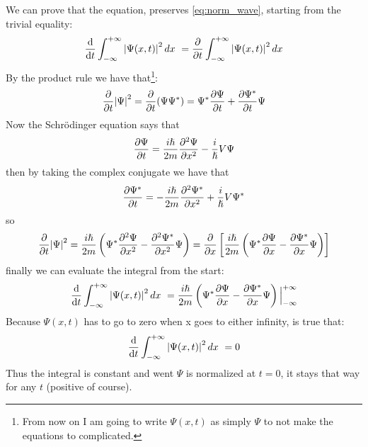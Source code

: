 We can prove that the equation, preserves \ref{eq:norm_wave}, starting from the trivial equality:
$$
\dv{t} \int_{-\infty}^{+\infty}\abs{\Psi(x,t)}^2\, dx\ = \pdv{t} \int_{-\infty}^{+\infty}\abs{\Psi(x,t)}^2\, dx
$$
By the product rule we have that\footnote{From now on I am going to write $\Psi(x,t)$ as simply $\Psi$ to not make the equations to complicated.}:
$$
\pdv{t}\abs{\Psi}^2 = \pdv{t}(\Psi\Psi^*) = \Psi^*\pdv{\Psi}{t} + \pdv{\Psi^*}{t}\Psi
$$
Now the Schrödinger equation says that 
$$
\pdv{\Psi}{t} = \frac{i\hslash}{2m}\pdv[2]{\Psi}{x} -  \frac{i}{\hslash}V\Psi
$$
then by taking the complex conjugate we have that 
$$
\pdv{\Psi^*}{t} = - \frac{i\hslash}{2m}\pdv[2]{\Psi^*}{x} + \frac{i}{\hslash}V\Psi^*
$$
so
$$
\pdv{t}\abs{\Psi}^2 = \frac{i\hslash}{2m} \left( \Psi^*\pdv[2]{\Psi}{x} - \pdv[2]{\Psi^*}{x}\Psi \right) = \pdv{x} \left[ \frac{i\hslash}{2m} \left(\Psi^*\pdv{\Psi}{x} - \pdv{\Psi^*}{x}\Psi\right)\right]
$$
finally we can evaluate the integral from the start:
$$
\dv{t} \int_{-\infty}^{+\infty}\abs{\Psi(x,t)}^2\, dx\ = \frac{i\hslash}{2m} \left( \Psi^*\pdv{\Psi}{x} - \pdv{\Psi^*}{x}\Psi \right) \Big|_{-\infty}^{+\infty}
$$
Because $\Psi(x,t)$ has to go to zero when x goes to either infinity, is true that:
$$
\dv{t} \int_{-\infty}^{+\infty}\abs{\Psi(x,t)}^2\, dx\ = 0
$$
Thus the integral is constant and went $\Psi$ is normalized at $t=0$, it stays that way for any $t$ (positive of course).

